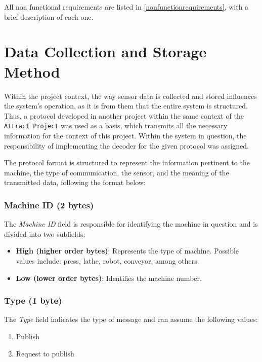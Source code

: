 All non functional requirements are listed in \ref{nonfunctionrequirements}, with a brief description of each one.

\section[Data Collection and Storage Method]{Data Collection and Storage Method}

Within the project context, the way sensor data is collected and stored influences the system's operation, as it is from them that the entire system is structured. Thus, a protocol developed in another project within the same context of the \texttt{Attract Project} was used as a basis, which transmits all the necessary information for the context of this project. Within the system in question, the responsibility of implementing the decoder for the given protocol was assigned.

The protocol format is structured to represent the information pertinent to the machine, the type of communication, the sensor, and the meaning of the transmitted data, following the format below:

\subsubsection{Machine ID (2 bytes)}

The \textit{Machine ID} field is responsible for identifying the machine in question and is divided into two subfields:

\begin{itemize}
    \item \textbf{High (higher order bytes)}: Represents the type of machine. Possible values include: press, lathe, robot, conveyor, among others.
    \item \textbf{Low (lower order bytes)}: Identifies the machine number.
\end{itemize}

\subsubsection{Type (1 byte)}

The \textit{Type} field indicates the type of message and can assume the following values:
\begin{enumerate}
    \item Publish
    \item Request to publish
\end{enumerate}

